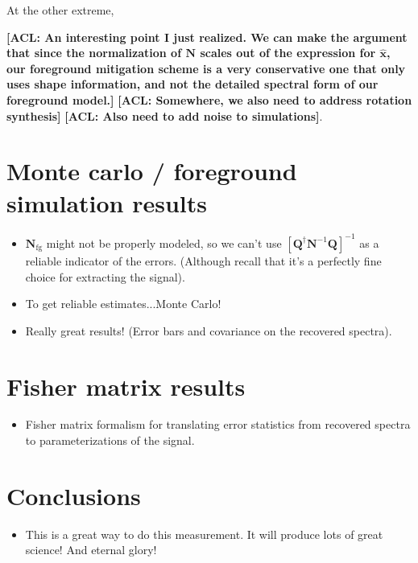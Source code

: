 \documentclass[twolcolumn,apj]{emulateapj}
\newcommand{\acl}[1]{{\color{red} \textbf{[ACL:  #1]}}}
\begin{document}
At the other extreme, 

\acl{An interesting point I just realized.  We can make the argument that since the normalization of $\mathbf{N}$ scales out of the expression for $\hat{\mathbf{x}}$, our foreground mitigation scheme is a very conservative one that only uses shape information, and not the detailed spectral form of our foreground model.}
\acl{Somewhere, we also need to address rotation synthesis}
\acl{Also need to add noise to simulations}.

\section{Monte carlo / foreground simulation results}
\begin{itemize}
\item $\mathbf{N}_\textrm{fg}$ might not be properly modeled, so we can't use $[\mathbf{Q}^\dagger \mathbf{N}^{-1} \mathbf{Q}]^{-1}$ as a reliable indicator of the errors.  (Although recall that it's a perfectly fine choice for extracting the signal).
\item To get reliable estimates...Monte Carlo!
\item Really great results! (Error bars and covariance on the recovered spectra).
\end{itemize}

\section{Fisher matrix results}
\begin{itemize}
\item Fisher matrix formalism for translating error statistics from recovered spectra to parameterizations of the signal.
\end{itemize}

\section{Conclusions}
\begin{itemize}
\item This is a great way to do this measurement.  It will produce lots of great science! And eternal glory!
\end{itemize}


{}
\end{document}
